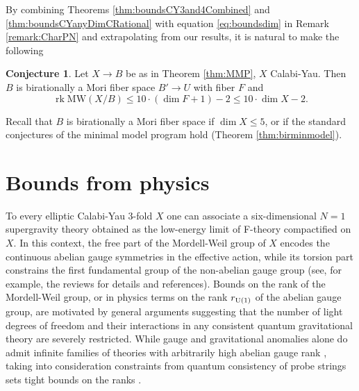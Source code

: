 \documentclass[11pt]{amsart}
\theoremstyle{definition}
\theoremstyle{definition}
\theoremstyle{remark}
\theoremstyle{remark}
\theoremstyle{definition}
\theoremstyle{conjecture}
\newtheorem{conjecture}[theorem]{Conjecture}
\newcommand{\MW}{\mathrm{MW}}
\begin{document}
By combining Theorems  \ref{thm:boundsCY3and4Combined} and \ref{thm:boundsCYanyDimCRational} with  equation \ref{eq:boundsdim} in Remark \ref{remark:CharPN} and extrapolating from our results, it is natural to make the following 
\begin{conjecture}\label{conjecture} Let  $ X \to B$ be as in Theorem \ref{thm:MMP}, $X$ Calabi-Yau. 
Then   $B$ is birationally    a  Mori fiber space  $B' \to U$ with %
      fiber  $F$ and 
\[\operatorname{rk} \MW(X/B)  \leq 10 \cdot (\dim F +1) -2 \leq 10 \cdot \dim X -2. \]

 \end{conjecture}
 Recall that  $B$ is birationally a Mori fiber space if $\dim X \leq 5$, or if  the standard conjectures of the minimal model program hold   (Theorem \ref{thm:birminmodel}). 
  

 \appendix
 
 \section{Bounds from physics}\label{sec:Appendix}

To every elliptic Calabi-Yau $3$-fold $X$
one can associate a six-dimensional $N=1$ supergravity theory obtained as the low-energy limit of F-theory \cite{Vafa:1996xn, Morrison:1996na, Morrison:1996pp} compactified on $X$.
In this context,
 the free 
 part of the Mordell-Weil group of $X$ encodes
 the continuous abelian gauge symmetries in the effective action, while its torsion part
  constrains the first fundamental group of the non-abelian gauge group (see, for example, the reviews \cite{Weigand:2018rez,Cvetic:2018bni} for details and references). 
 Bounds on the rank of the Mordell-Weil group, or in physics terms on the rank $r_{\rm U(1)}$ of the abelian gauge group, are motivated by general arguments 
suggesting that the number of light degrees of freedom and their interactions  in any consistent
quantum gravitational theory are severely restricted. 
 While gauge and gravitational anomalies alone do admit infinite families of theories with arbitrarily high abelian gauge rank \cite{Park:2011wv}, taking into consideration constraints from quantum consistency of probe strings \cite{Kim:2019vuc} sets tight bounds on the ranks \cite{Lee:2019skh,Martucci:2022krl,Lee:2022swr,Kim:2024eoa}. 
\end{document}
